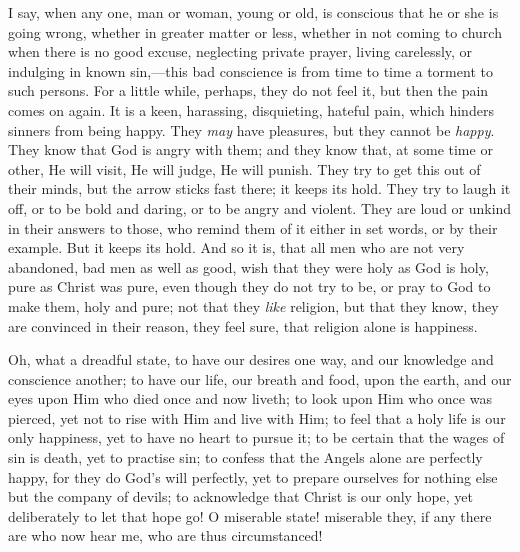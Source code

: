 I say, when any one, man or woman, young or old, is conscious that
he or she is going wrong, whether in greater matter or less, whether
in not coming to church when there is no good excuse, neglecting
private prayer, living carelessly, or indulging in known sin,—this
bad conscience is from time to time a torment to such persons. For a
little while, perhaps, they do not feel it, but then the pain comes on
again. It is a keen, harassing, disquieting, hateful pain, which
hinders sinners from being happy. They \emph{may} have pleasures, but they
cannot be \emph{happy}. They know that God is angry with them; and
they know that, at some time or other, He will visit, He will judge,
He will punish. They try to get this out of their minds, but the arrow
sticks fast there; it keeps its hold. They try to laugh it off, or to
be bold and daring, or to be angry and violent. They are loud or
unkind in their answers to those, who remind them of it either in set
words, or by their example. But it keeps its hold. And so it is, that
all men who are not very abandoned, bad men as well as good, wish that
they were holy as God is holy, pure as Christ was pure, even though
they do not try to be, or pray to God to make them, holy and pure; not
that they \emph{like} religion, but that they know, they are convinced
in their reason, they feel sure, that religion alone is happiness.

Oh, what a dreadful state, to have our desires one way, and our
knowledge and conscience another; to have our life, our breath and
food, upon the earth, and our eyes upon Him who died once and now
liveth; to look upon Him who once was pierced, yet not to rise with
Him and live with Him; to feel that a holy life is our only happiness,
yet to have no heart to pursue it; to be certain that the wages of sin
is death, yet to practise sin; to confess that the Angels alone are
perfectly happy, for they do God's will perfectly, yet to prepare
ourselves for nothing else but the company of devils; to acknowledge
that Christ is our only hope, yet deliberately to let that hope go! O
miserable state! miserable they, if any there are who now hear me, who
are thus circumstanced!

